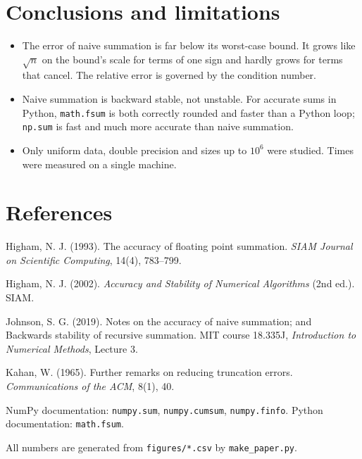 \documentclass[11pt,a4paper]{article}
\begin{document}
\section{Conclusions and limitations}

\begin{itemize}
  \item The error of naive summation is far below its worst-case bound. It grows like $\sqrt{n}$ on the bound's scale for
  terms of one sign and hardly grows for terms that cancel. The relative error is governed by the condition number.
  \item Naive summation is backward stable, not unstable. For accurate sums in Python, \texttt{math.fsum} is both correctly
  rounded and faster than a Python loop; \texttt{np.sum} is fast and much more accurate than naive summation.
  \item Only uniform data, double precision and sizes up to $10^6$ were studied. Times were measured on a single machine.
\end{itemize}

\section*{References}
{\small
\setlength{\parskip}{2pt}
\hangindent=1.27cm Higham, N. J. (1993). The accuracy of floating point summation. \textit{SIAM Journal on Scientific Computing}, 14(4), 783--799.\par
\hangindent=1.27cm Higham, N. J. (2002). \textit{Accuracy and Stability of Numerical Algorithms} (2nd ed.). SIAM.\par
\hangindent=1.27cm Johnson, S. G. (2019). Notes on the accuracy of naive summation; and Backwards stability of recursive summation.
MIT course 18.335J, \textit{Introduction to Numerical Methods}, Lecture 3.\par
\hangindent=1.27cm Kahan, W. (1965). Further remarks on reducing truncation errors. \textit{Communications of the ACM}, 8(1), 40.\par
\hangindent=1.27cm NumPy documentation: \texttt{numpy.sum}, \texttt{numpy.cumsum}, \texttt{numpy.finfo}. Python documentation: \texttt{math.fsum}.\par

\smallskip
All numbers are generated from
\texttt{figures/*.csv} by \texttt{make\_paper.py}.
}
\end{document}
